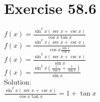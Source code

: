 \documentclass[a4paper, 10pt]{scrartcl}
\begin{document}
\section{Exercise 58.6}

$f(x) = \frac{\sin^{2}{x}(\sec{x} + \csc{x})}{\cos{x}\tan{x}}$\\
$f(x) = \frac{\sin^{2}{x}(\sec{x} + \csc{x})}{\cos{x}\frac{\sin{x}}{\cos{x}}}$\\
$f(x) = \frac{\sin^{2}{x}(\sec{x} + \csc{x})}{\sin{x}}$\\
$f(x) = \frac{\sin^{2}{x}(\frac{1}{\cos{x}} + \frac{1}{\sin{x}})}{\sin{x}}$\\

Solution:\\
$\frac{\sin^{2}{x}(\sec{x} + \csc{x})}{\cos{x}\tan{x}} = 1 + \tan{x}$\\
\end{document}
